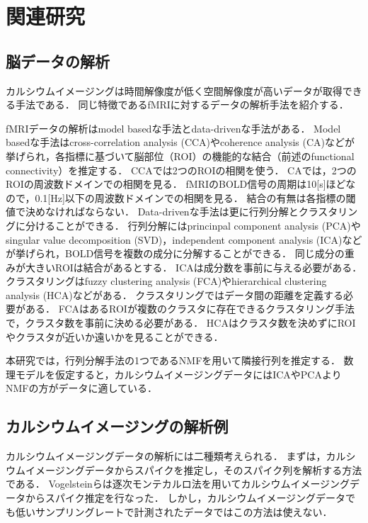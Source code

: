 \section{関連研究}
\subsection{脳データの解析}
カルシウムイメージングは時間解像度が低く空間解像度が高いデータが取得できる手法である．
同じ特徴であるfMRIに対するデータの解析手法を紹介する．

fMRIデータの解析はmodel basedな手法とdata-drivenな手法がある\cite{Li2009}．
Model basedな手法はcross-correlation analysis (CCA)やcoherence analysis (CA)などが挙げられ，各指標に基づいて脳部位（ROI）の機能的な結合（前述のfunctional connectivity）を推定する．
CCAでは2つのROIの相関を使う．
CAでは，2つのROIの周波数ドメインでの相関を見る．
fMRIのBOLD信号の周期は10[s]ほどなので，0.1[Hz]以下の周波数ドメインでの相関を見る．
結合の有無は各指標の閾値で決めなければならない．
Data-drivenな手法は更に行列分解とクラスタリングに分けることができる．
行列分解にはprincinpal component analysis (PCA)やsingular value decomposition (SVD)，independent component analysis (ICA)などが挙げられ，BOLD信号を複数の成分に分解することができる．
同じ成分の重みが大きいROIは結合があるとする．
ICAは成分数を事前に与える必要がある．
クラスタリングはfuzzy clustering analysis (FCA)やhierarchical clustering analysis (HCA)などがある．
クラスタリングではデータ間の距離を定義する必要がある．
FCAはあるROIが複数のクラスタに存在できるクラスタリング手法で，クラスタ数を事前に決める必要がある．
HCAはクラスタ数を決めずにROIやクラスタが近いか遠いかを見ることができる．

本研究では，行列分解手法の1つであるNMFを用いて隣接行列を推定する．
数理モデルを仮定すると，カルシウムイメージングデータにはICAやPCAよりNMFの方がデータに適している．

\subsection{カルシウムイメージングの解析例}
カルシウムイメージングデータの解析には二種類考えられる．
まずは，カルシウムイメージングデータからスパイクを推定し，そのスパイク列を解析する方法である．
Vogelsteinらは逐次モンテカルロ法を用いてカルシウムイメージングデータからスパイク推定を行なった\cite{Vogelstein2009}．
しかし，カルシウムイメージングデータでも低いサンプリングレートで計測されたデータではこの方法は使えない．

